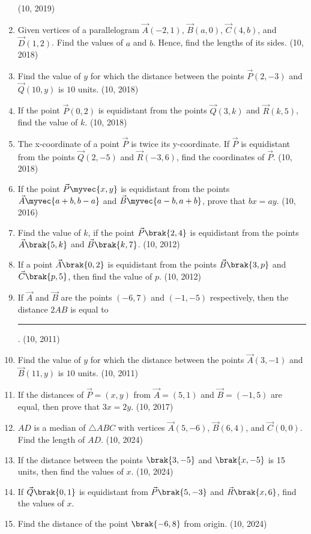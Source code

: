 \begin{enumerate}[label=\thesubsection.\arabic*, ref=\thesubsection.\theenumi]
	\hfill (10, 2019)
    \item Given vertices of a parallelogram $\vec{A}(-2,1)$, $\vec{B}(a,0)$, $\vec{C}(4,b)$, and $\vec{D}(1,2)$. Find the values of $a$ and $b$. Hence, find the lengths of its sides. \hfill (10, 2018)
    \item Find the value of $y$ for which the distance between the points $\vec{P}(2,-3)$ and $\vec{Q}(10,y)$ is $10$ units. \hfill (10, 2018)
    \item If the point $\vec{P}(0,2)$ is equidistant from the points $\vec{Q}(3,k)$ and $\vec{R}(k,5)$, find the value of $k$. \hfill (10, 2018)
    \item The x-coordinate of a point $\vec{P}$ is twice its y-coordinate. If $\vec{P}$ is equidistant from the points $\vec{Q}(2,-5)$ and $\vec{R}(-3,6)$, find the coordinates of $\vec{P}$. \hfill (10, 2018)
    \item If the point $\vec{P} \myvec{x, y}$ is equidistant from the points $\vec{A} \myvec{a+b, b-a}$ and $\vec{B} \myvec{a-b, a+b}$, prove that $bx = ay$. \hfill (10, 2016)
\item Find the value of $k$, if the point $\vec{P}\brak{2,4}$ is equidistant from the points $\vec{A}\brak{5,k}$ and $\vec{B}\brak{k,7}$. 
\hfill (10, 2012)
\item If a point $\vec{A}\brak{0,2}$ is equidistant from the points $\vec{B}\brak{3,p}$ and $\vec{C}\brak{p,5}$, then find the value of $p$. 
\hfill (10, 2012)
\item If $\vec{A}$ and $\vec{B}$ are the points $(-6, 7)$ and $(-1, -5)$ respectively, then the distance $2AB$ is equal to
\rule{1cm}{0.2pt}.
\hfill (10, 2011)
\item Find the value of $y$ for which the distance between the points $\vec{A}(3, -1)$ and $\vec{B}(11, y)$ is $10$ units.
\hfill (10, 2011)
\item If the distances of $\vec{P} = (x, y)$ from $\vec{A} = (5, 1)$ and $\vec{B} = (-1, 5)$ are equal, then prove that $3x = 2y$. \hfill (10, 2017)
\item $AD$ is a median of $\triangle ABC$ with vertices $\vec{A}(5, -6)$, $\vec{B}(6, 4)$, and $\vec{C}(0, 0)$. Find the length of $AD$. 
\hfill	(10, 2024)
 \item If the distance between the points $\brak{3, -5}$ and $\brak{x, -5}$ is 15 units, then find the values of $x$. 
\hfill	(10, 2024)
\item If $\vec{Q}\brak{0,1}$ is equidistant from $\vec{P}\brak{5,-3}$ and $\vec{R}\brak{x,6}$, find the values of $x$.
\item Find the distance of the point $\brak{-6,8}$ from origin. 
\hfill	(10, 2024)
\end{enumerate}
